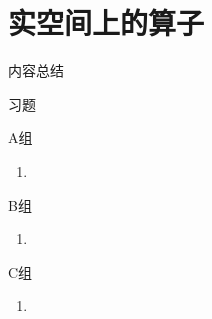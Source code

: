 \chapter{实空间上的算子}

\vspace{2ex} 
\centerline{\heiti \Large 内容总结}

\vspace{2ex} 

\centerline{\heiti \Large 习题}
\vspace{2ex} 
{\kaishu }
\begin{flushright}
    \kaishu

\end{flushright}
\centerline{\heiti A组}
\begin{enumerate}
	\item 
\end{enumerate}
\centerline{\heiti B组}
\begin{enumerate}
	\item 
\end{enumerate}
\centerline{\heiti C组}
\begin{enumerate}
	\item 
\end{enumerate}
